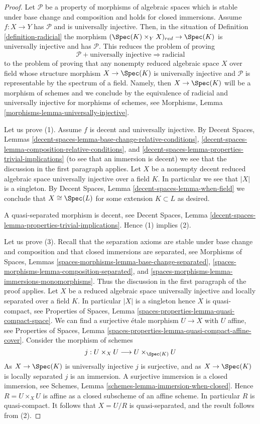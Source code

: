 \begin{proof}
Let $\mathcal{P}$ be a property of morphisms of algebraic spaces
which is stable under base change and composition and holds for
closed immersions. Assume $f : X \to Y$ has $\mathcal{P}$ and
is universally injective. Then, in the situation of
Definition \ref{definition-radicial}
the morphism $(\Spec(K) \times_Y X)_{red} \to \Spec(K)$
is universally injective and has $\mathcal{P}$. This reduces the
problem of proving
$$
\mathcal{P} + \text{universally injective}
\Rightarrow
\text{radicial}
$$
to the problem of proving that any nonempty reduced algebraic space $X$
over field whose structure morphism $X \to \Spec(K)$ is universally
injective and $\mathcal{P}$ is representable by the spectrum of a field.
Namely, then $X \to \Spec(K)$ will be a morphism of schemes and
we conclude by the equivalence of radicial and universally injective for
morphisms of schemes, see
Morphisms, Lemma \ref{morphisms-lemma-universally-injective}.

\medskip\noindent
Let us prove (1). Assume $f$ is decent and universally injective. By
Decent Spaces,
Lemmas \ref{decent-spaces-lemma-base-change-relative-conditions},
\ref{decent-spaces-lemma-composition-relative-conditions}, and
\ref{decent-spaces-lemma-properties-trivial-implications}
(to see that an immersion is decent) we see that the discussion in
the first paragraph applies.
Let $X$ be a nonempty decent reduced algebraic space
universally injective over a field $K$. In particular we see that $|X|$
is a singleton. By
Decent Spaces, Lemma \ref{decent-spaces-lemma-when-field}
we conclude that $X \cong \Spec(L)$ for some extension
$K \subset L$ as desired.

\medskip\noindent
A quasi-separated morphism is decent, see
Decent Spaces,
Lemma \ref{decent-spaces-lemma-properties-trivial-implications}.
Hence (1) implies (2).

\medskip\noindent
Let us prove (3).
Recall that the separation axioms are stable under base change
and composition and that closed immersions are separated, see
Morphisms of Spaces,
Lemmas \ref{spaces-morphisms-lemma-base-change-separated},
\ref{spaces-morphisms-lemma-composition-separated}, and
\ref{spaces-morphisms-lemma-immersions-monomorphisms}.
Thus the discussion in the first paragraph of the proof applies.
Let $X$ be a reduced algebraic space universally injective and
locally separated over a field $K$.
In particular $|X|$ is a singleton hence $X$ is quasi-compact, see
Properties of Spaces, Lemma \ref{spaces-properties-lemma-quasi-compact-space}.
We can find a surjective \'etale morphism $U \to X$ with $U$ affine, see
Properties of Spaces,
Lemma \ref{spaces-properties-lemma-quasi-compact-affine-cover}.
Consider the morphism of schemes
$$
j :
U \times_X U
\longrightarrow
U \times_{\Spec(K)} U
$$
As $X \to \Spec(K)$ is universally injective $j$ is surjective,
and as $X \to \Spec(K)$ is locally separated $j$ is an immersion.
A surjective immersion is a closed immersion, see
Schemes, Lemma \ref{schemes-lemma-immersion-when-closed}.
Hence $R = U \times_X U$ is affine as a closed subscheme of an affine scheme.
In particular $R$ is quasi-compact.
It follows that $X = U/R$ is quasi-separated, and the result follows from (2).
\end{proof}

